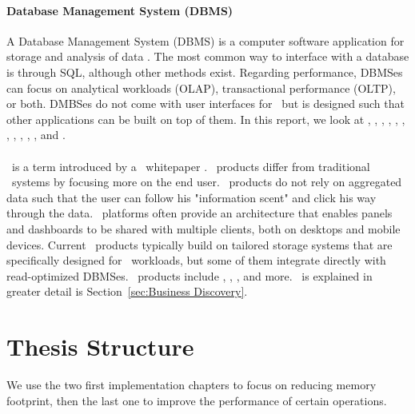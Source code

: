 \paragraph{Database Management System (DBMS)}
\label{par:Database Management System (DBMS)}
A Database Management System (DBMS) is a computer software application for storage and analysis of data \cite{Wikipedia_contributors2015-pb}. The most common way to interface with a database is through SQL, although other methods exist. Regarding performance, DBMSes can focus on analytical workloads (OLAP), transactional performance (OLTP), or both. DMBSes do not come with user interfaces for \bd~but is designed such that other applications can be built on top of them. In this report, we look at \oracle, \ibm, \saph, \sapnw, \mssql, \cstore, \vertica, \blink, \exasol, \oracle, \hyper, and \hyrise.

\paragraph{\bd}
\label{par:Business Discovery}
\bd~is a term introduced by a \qlikview~whitepaper \cite{Qlik2014-vd}. \bd~products differ from traditional \bi~systems by focusing more on the end user. \bd~products do not rely on aggregated data such that the user can follow his "information scent" and click his way through the data. \bd~platforms often provide an architecture that enables panels and dashboards to be shared with multiple clients, both on desktops and mobile devices. Current \bd~products typically build on tailored storage systems that are specifically designed for \bd~workloads, but some of them integrate directly with read-optimized DBMSes. \bd~products include \tableau, \qlikview, \powerpivot, and more. \bd~is explained in greater detail is Section~\ref{sec:Business Discovery}.



\section{Thesis Structure}
\label{sec:Thesis Structure}
We use the two first implementation chapters to focus on reducing memory footprint, then the last one to improve the performance of certain operations.

